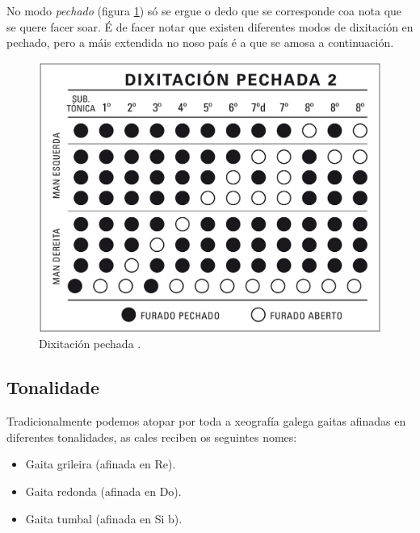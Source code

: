  No modo \textit{pechado}
 (figura \ref{figura:PabloCarpinteroDixitacionPechada}) só se ergue o dedo que
 se corresponde coa nota que se quere facer soar. É de facer notar que existen
 diferentes modos de dixitación en pechado, pero a máis extendida no noso país
 é a que se amosa a continuación. \\

 \begin{figure}[htbp]
  \centering
  \includegraphics[scale=0.2,keepaspectratio=true]{./imagenes/pablo-carpintero-dixitacion-pechada-2.jpg}
  \caption[Dixitación pechada]{Dixitación pechada \cite{PabloCarpintero}.}
  \label{figura:PabloCarpinteroDixitacionPechada}
 \end{figure}

 \subsection{Tonalidade}

 Tradicionalmente podemos atopar por toda a xeografía galega gaitas afinadas en
 diferentes tonalidades, as cales reciben os seguintes nomes:

 \begin{itemize}
  \item Gaita grileira (afinada en Re).
  \item Gaita redonda (afinada en Do).
  \item Gaita tumbal (afinada en Si b).
 \end{itemize}

